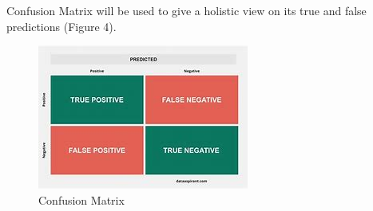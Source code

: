 \documentclass[10pt,twocolumn]{article}
\begin{document}
Confusion Matrix will be used to give a holistic view on its true and false predictions (Figure 4).

\begin{figure}[h]
\centering
\caption{Confusion Matrix}
\includegraphics[scale=0.5]{ConfusionMatrix.jpg}\newline
\end{figure}
\end{document}

